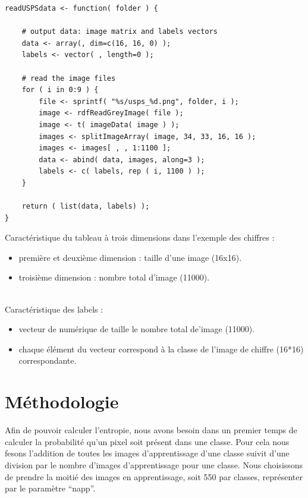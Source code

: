 \documentclass[a4paper,11pt]{article}
\begin{document}
  \begin{lstlisting}[caption=Fonction qui lit toutes les images et construit la base et les labels]
readUSPSdata <- function( folder ) {

    # output data: image matrix and labels vectors
    data <- array(, dim=c(16, 16, 0) );
    labels <- vector( , length=0 );

    # read the image files 
    for ( i in 0:9 ) {
        file <- sprintf( "%s/usps_%d.png", folder, i );
        image <- rdfReadGreyImage( file );
        image <- t( imageData( image ) );
        images <- splitImageArray( image, 34, 33, 16, 16 );
        images <- images[ , , 1:1100 ];
        data <- abind( data, images, along=3 );
        labels <- c( labels, rep ( i, 1100 ) );
    } 

    return ( list(data, labels) );
}
  \end{lstlisting}

  
  Caractéristique du tableau à trois dimensions dans l'exemple des chiffres :
  \begin{itemize}
   \item première et deuxième dimension : taille d'une image (16x16).
   \item troisième dimension : nombre total d'image (11000).
  \end{itemize}
  \ \\

  Caractéristique des labels :
  \begin{itemize}
   \item vecteur de numérique de taille le nombre total de'image (11000).
   \item chaque élément du vecteur correspond à la classe de l'image de chiffre (16*16) correspondante.
  \end{itemize}
  
  \section{Méthodologie}
  Afin de pouvoir calculer l'entropie, nous avons besoin dans un premier temps de calculer la probabilité qu'un 
  pixel soit présent dans une classe. Pour cela nous fesons l'addition de toutes les images d'apprentissage d'une classe 
  suivit d'une division par le nombre d'images d'apprentissage pour une classe. Nous choisissons de prendre la moitié
  des images en apprentissage, soit 550 par classes, représenter par le paramètre \enquote{napp}.\\
  
\end{document}
